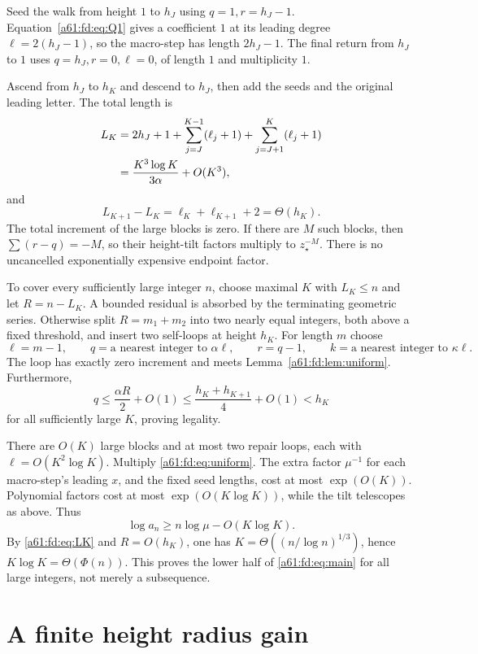 \documentclass[11pt,letterpaper]{article}
\numberwithin{equation}{section}
\theoremstyle{remark}\newtheorem{remark}[theorem]{Remark}
\newcommand{\st}{\star}
\begin{document}
Seed the walk from height $1$ to $h_J$ using $q=1,r=h_J-1$. Equation~\eqref{a61:fd:eq:Q1} gives a coefficient $1$ at its leading degree $\ell=2(h_J-1)$, so the macro-step has length $2h_J-1$. The final return from $h_J$ to $1$ uses $q=h_J,r=0,\ell=0$, of length $1$ and multiplicity $1$.

Ascend from $h_J$ to $h_K$ and descend to $h_J$, then add the seeds and the original leading letter. The total length is
\begin{align}\label{a61:fd:eq:LK}
 L_K&=2h_J+1+\sum_{j=J}^{K-1}(\ell_j+1)
                +\sum_{j=J+1}^{K}(\ell_j+1)\notag\\
 &=\frac{K^3\log K}{3\alpha}+O(K^3),
\end{align}
and
\[
 L_{K+1}-L_K=\ell_K+\ell_{K+1}+2=\Theta(h_K).
\]
The total increment of the large blocks is zero. If there are $M$ such blocks, then $\sum(r-q)=-M$, so their height-tilt factors multiply to $z_\st^{-M}$. There is no uncancelled exponentially expensive endpoint factor.

To cover every sufficiently large integer $n$, choose maximal $K$ with $L_K\le n$ and let $R=n-L_K$. A bounded residual is absorbed by the terminating geometric series. Otherwise split $R=m_1+m_2$ into two nearly equal integers, both above a fixed threshold, and insert two self-loops at height $h_K$. For length $m$ choose
\[
 \ell=m-1,\qquad q=\text{a nearest integer to }\alpha\ell,
 \qquad r=q-1,\qquad k=\text{a nearest integer to }\kappa\ell.
\]
The loop has exactly zero increment and meets Lemma~\ref{a61:fd:lem:uniform}. Furthermore,
\[
 q\le\frac{\alpha R}{2}+O(1)
 \le\frac{h_K+h_{K+1}}4+O(1)<h_K
\]
for all sufficiently large $K$, proving legality.

There are $O(K)$ large blocks and at most two repair loops, each with $\ell=O(K^2\log K)$. Multiply \eqref{a61:fd:eq:uniform}. The extra factor $\mu^{-1}$ for each macro-step's leading $x$, and the fixed seed lengths, cost at most $\exp(O(K))$. Polynomial factors cost at most $\exp(O(K\log K))$, while the tilt telescopes as above. Thus
\[
 \log a_n\ge n\log\mu-O(K\log K).
\]
By \eqref{a61:fd:eq:LK} and $R=O(h_K)$, one has
$K=\Theta((n/\log n)^{1/3})$, hence $K\log K=\Theta(\Phi(n))$. This proves the lower half of \eqref{a61:fd:eq:main} for all large integers, not merely a subsequence.

\section{A finite height radius gain}
\end{document}
